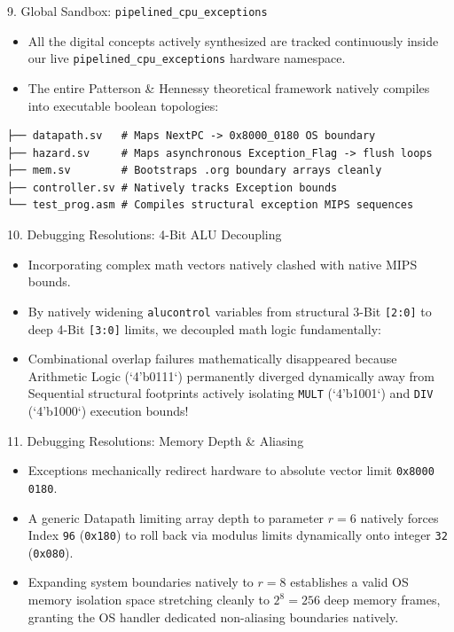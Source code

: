 \documentclass[aspectratio=169]{beamer}
\begin{document}
\begin{frame}[fragile]{9. Global Sandbox: \texttt{pipelined\_cpu\_exceptions}}
\begin{itemize}
    \item All the digital concepts actively synthesized are tracked continuously inside our live \texttt{pipelined\_cpu\_exceptions} hardware namespace.\
    \item The entire Patterson \& Hennessy theoretical framework natively compiles into executable boolean topologies:
\end{itemize}
\begin{verbatim}
├── datapath.sv   # Maps NextPC -> 0x8000_0180 OS boundary
├── hazard.sv     # Maps asynchronous Exception_Flag -> flush loops
├── mem.sv        # Bootstraps .org boundary arrays cleanly
├── controller.sv # Natively tracks Exception bounds
└── test_prog.asm # Compiles structural exception MIPS sequences
\end{verbatim}
\end{frame}

\begin{frame}{10. Debugging Resolutions: 4-Bit ALU Decoupling}
\begin{itemize}
    \item Incorporating complex math vectors natively clashed with native MIPS bounds.
    \item By natively widening \texttt{alucontrol} variables from structural 3-Bit \texttt{[2:0]} to deep 4-Bit \texttt{[3:0]} limits, we decoupled math logic fundamentally:
    \item Combinational overlap failures mathematically disappeared because Arithmetic Logic (`4'b0111`) permanently diverged dynamically away from Sequential structural footprints actively isolating \texttt{MULT} (`4'b1001`) and \texttt{DIV} (`4'b1000`) execution bounds!
\end{itemize}
\end{frame}

\begin{frame}{11. Debugging Resolutions: Memory Depth \& Aliasing}
\begin{itemize}
    \item Exceptions mechanically redirect hardware to absolute vector limit \texttt{0x8000 0180}.
    \item A generic Datapath limiting array depth to parameter $r=6$ natively forces Index \texttt{96} (\texttt{0x180}) to roll back via modulus limits dynamically onto integer \texttt{32} (\texttt{0x080}).
    \item Expanding system boundaries natively to $r=8$ establishes a valid OS memory isolation space stretching cleanly to $2^8 = 256$ deep memory frames, granting the OS handler dedicated non-aliasing boundaries natively.
\end{itemize}
\end{frame}
\end{document}
